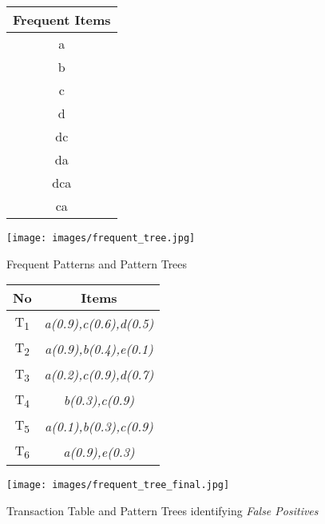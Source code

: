%
\begin{figure}
\begin{minipage}{0.40\textwidth}
  \centering
  
	\begin{center}
	\begin{tabular}{ |c| } 
 	\hline
 		Frequent Items\\ \hline\hline
 		a \\ \hline
 		b \\ \hline
 		c \\ \hline
 		d \\ \hline
 		dc \\ \hline
 		da \\ \hline
 		dca \\ \hline
 		ca \\ \hline
\end{tabular}
\end{center}  
  
  
\end{minipage}
\hfill
\begin{minipage}{0.40\textwidth}
  \centering
  \texttt{[image: images/frequent\_tree.jpg]}
\end{minipage}
\caption{Frequent Patterns and Pattern Trees}
\label{figure:frequent_patterns}
\end{figure}
\begin{figure}
\begin{minipage}{.4\textwidth}
  \centering
  
	\begin{center}
	\begin{tabular}{ |c|c| } 
 	\hline
 		No & Items \\ \hline\hline
 		T\textsubscript{1} & \emph{a(0.9),c(0.6),d(0.5)}\\ \hline
 		T\textsubscript{2}& \emph{a(0.9),b(0.4),e(0.1)}\\ \hline
 		T\textsubscript{3}& \emph{a(0.2),c(0.9),d(0.7)}\\ \hline
 		T\textsubscript{4}& \emph{b(0.3),c(0.9)}\\ \hline
 		T\textsubscript{5}& \emph{a(0.1),b(0.3),c(0.9)} \\ \hline
 		T\textsubscript{6} & \emph{a(0.9),e(0.3)
}\\ \hline
\end{tabular}
\end{center}  
\end{minipage}
\hfill
\begin{minipage}{0.50\textwidth}
  \centering
  \texttt{[image: images/frequent\_tree\_final.jpg]}
\end{minipage}
\caption{Transaction Table and Pattern Trees identifying \emph{False Positives}}
\label{figure:frequent_patterns_final}
\end{figure}
%
